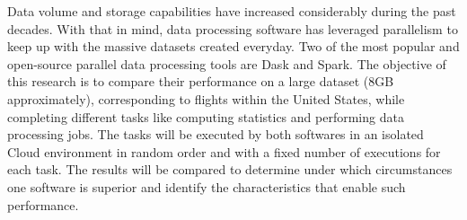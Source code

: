\documentclass[11pt, oneside]{book}
\begin{document}
\noindent Data volume and storage capabilities have increased considerably during the past decades. With that in mind, data processing software has leveraged parallelism to keep up with the massive datasets created everyday. Two of the most popular and open-source parallel data processing tools are Dask and Spark. The objective of this research is to compare their performance on a large dataset (8GB
approximately), corresponding to flights within the United States, while completing different tasks
like computing statistics and performing data processing jobs. The tasks will be executed by both
softwares in an isolated Cloud environment in random order and with a fixed number of executions
for each task. The results will be compared to determine under which circumstances one software is
superior and identify the characteristics that enable such performance.

\pagestyle{plain}

\noindent 


\tableofcontents


\listoftables

\listoffigures


\mainmatter %

\pagestyle{plain}















\end{document}
